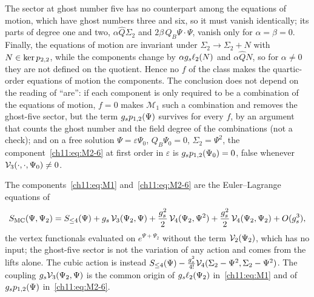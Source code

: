 The sector at ghost number five has no counterpart among the equations of motion, which have ghost numbers three and six, so it must vanish identically; its parts of degree one and two, $\alpha \hat{Q} \Sigma_2$ and $2 \beta \, Q_B \Psi \cdot \Psi$, vanish only for $\alpha = \beta = 0$.
Finally, the equations of motion are invariant under $\Sigma_2 \to \Sigma_2 + N$ with $N \in \ker p_{2,2}$, while the components change by $\alpha g_s \ell_2(N)$ and $\alpha \hat{Q} N$, so for $\alpha \ne 0$ they are not defined on the quotient.
Hence no $f$ of the class makes the quartic-order equations of motion the components.
The conclusion does not depend on the reading of \enquote{are}: if each component is only required to be a combination of the equations of motion, $f = 0$ makes $\mathcal{M}_1$ such a combination and removes the ghost-five sector, but the term $g_s p_{1,2}(\Psi)$ survives for every $f$, by an argument that counts the ghost number and the field degree of the combinations (not a check); and on a free solution $\Psi = \varepsilon \Psi_0$, $Q_B \Psi_0 = 0$, $\Sigma_2 = \Psi^2$, the component~\eqref{ch11:eq:M2-6} at first order in $\varepsilon$ is $g_s p_{1,2}(\Psi_0) = 0$, false whenever $\mathcal{V}_{3}(\cdot, \cdot, \Psi_0) \ne 0$.

The components~\eqref{ch11:eq:M1} and~\eqref{ch11:eq:M2-6} are the Euler--Lagrange equations of
\begin{equation}
  \label{ch11:eq:S-MC}
  S_{\mathrm{MC}}(\Psi, \Psi_2)
    = S_{\le 4}(\Psi) + g_s \, \mathcal{V}_{3}(\Psi_2, \Psi) + \frac{g_s^2}{2} \, \mathcal{V}_{4}(\Psi_2, \Psi^2) + \frac{g_s^2}{2} \, \mathcal{V}_{4}(\Psi_2, \Psi_2) + O(g_s^3),
\end{equation}
the vertex functionals evaluated on $e^{\Psi + \Psi_2}$ without the term $\mathcal{V}_{2}(\Psi_2)$, which has no input; the ghost-five sector is not the variation of any action and comes from the lifts alone.
The cubic action is instead $S_{\le 4}(\Psi) - \tfrac{g_s^2}{4!} \mathcal{V}_{4}(\Sigma_2 - \Psi^2, \Sigma_2 - \Psi^2)$.
The coupling $g_s \mathcal{V}_{3}(\Psi_2, \Psi)$ is the common origin of $g_s \ell_2(\Psi_2)$ in~\eqref{ch11:eq:M1} and of $g_s p_{1,2}(\Psi)$ in~\eqref{ch11:eq:M2-6}.

